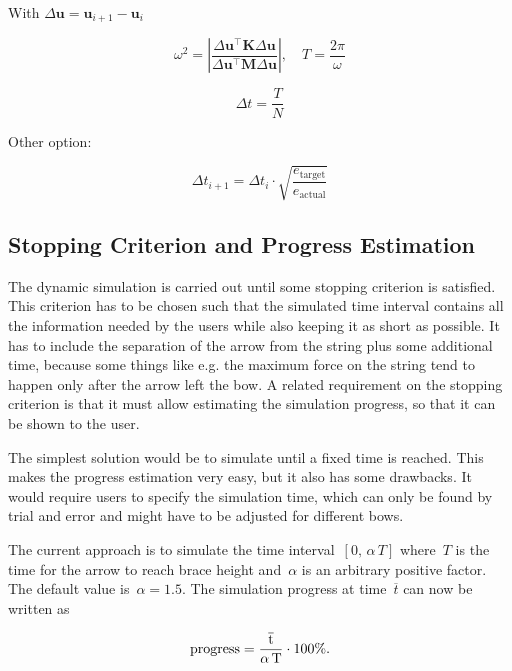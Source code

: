 With $\Delta \boldsymbol{u} = \boldsymbol{u}_{i+1} - \boldsymbol{u}_{i}$

\begin{equation}
\omega^2 = \left\vert \frac{\Delta \boldsymbol{u}^\intercal \boldsymbol{K} \Delta \boldsymbol{u}}{\Delta \boldsymbol{u}^\intercal   \boldsymbol{M} \Delta \boldsymbol{u}} \right\vert, \quad T = \frac{2\pi}{\omega}
\end{equation}

\begin{equation}
\Delta t = \frac{T}{N}
\end{equation}

Other option:

\begin{equation}
\Delta t_{i+1} = \Delta t_{i} \cdot \sqrt{\frac{e_{\mathrm{target}}}{e_{\mathrm{actual}}}}
\end{equation}




\newpage
\subsection{Stopping Criterion and Progress Estimation}

The dynamic simulation is carried out until some stopping criterion is satisfied.
This criterion has to be chosen such that the simulated time interval contains all the information needed by the users while also keeping it as short as possible.
It has to include the separation of the arrow from the string plus some additional time, because some things like e.g. the maximum force on the string tend to happen only after the arrow left the bow.
A related requirement on the stopping criterion is that it must allow estimating the simulation progress, so that it can be shown to the user.

The simplest solution would be to simulate until a fixed time is reached.
This makes the progress estimation very easy, but it also has some drawbacks.
It would require users to specify the simulation time, which can only be found by trial and error and might have to be adjusted for different bows.

The current approach is to simulate the time interval~$[0,\,\alpha\,T]$ where~$T$ is the time for the arrow to reach brace height and~$\alpha$ is an arbitrary positive factor.
The default value is~$\alpha = 1.5$. The simulation progress at time~$\overline{t}$ can now be written as

\begin{equation}
\rm{progress} = \frac{\overline{t}}{\alpha\,T}\cdot 100\%.
\end{equation}

